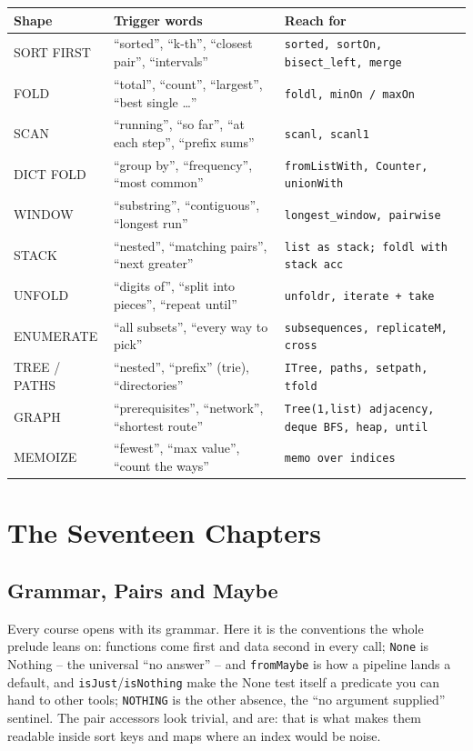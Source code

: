 \documentclass[10pt,letterpaper]{book}
\begin{document}
\begin{center}\small
\begin{tabular}{@{}p{}p{}p{}@{}}
\toprule
\textbf{Shape} & \textbf{Trigger words} & \textbf{Reach for} \\
\midrule
SORT FIRST & ``sorted'', ``k-th'', ``closest pair'', ``intervals'' & \texttt{sorted, sortOn, bisect\_left, merge} \\
FOLD & ``total'', ``count'', ``largest'', ``best single \ldots'' & \texttt{foldl, minOn / maxOn} \\
SCAN & ``running'', ``so far'', ``at each step'', ``prefix sums'' & \texttt{scanl, scanl1} \\
DICT FOLD & ``group by'', ``frequency'', ``most common'' & \texttt{fromListWith, Counter, unionWith} \\
WINDOW & ``substring'', ``contiguous'', ``longest run'' & \texttt{longest\_window, pairwise} \\
STACK & ``nested'', ``matching pairs'', ``next greater'' & \texttt{list as stack; foldl with stack acc} \\
UNFOLD & ``digits of'', ``split into pieces'', ``repeat until'' & \texttt{unfoldr, iterate + take} \\
ENUMERATE & ``all subsets'', ``every way to pick'' & \texttt{subsequences, replicateM, cross} \\
TREE / PATHS & ``nested'', ``prefix'' (trie), ``directories'' & \texttt{ITree, paths, setpath, tfold} \\
GRAPH & ``prerequisites'', ``network'', ``shortest route'' & \texttt{Tree(1,list) adjacency, deque BFS, heap, until} \\
MEMOIZE & ``fewest'', ``max value'', ``count the ways'' & \texttt{memo over indices} \\
\bottomrule
\end{tabular}
\end{center}

\tableofcontents
\mainmatter
\part{The Seventeen Chapters}
\chapter{Grammar, Pairs and Maybe}

Every course opens with its grammar. Here it is the conventions the whole
prelude leans on: functions come first and data second in every call;
\texttt{None} is Nothing -- the universal ``no answer'' -- and
\texttt{fromMaybe} is how a pipeline lands a default, and
\texttt{isJust}/\texttt{isNothing} make the None test itself a predicate you
can hand to other tools; \texttt{NOTHING} is the other absence, the ``no
argument supplied'' sentinel. The pair accessors look
trivial, and are: that is what makes them readable inside sort keys and maps
where an index would be noise.
\end{document}

